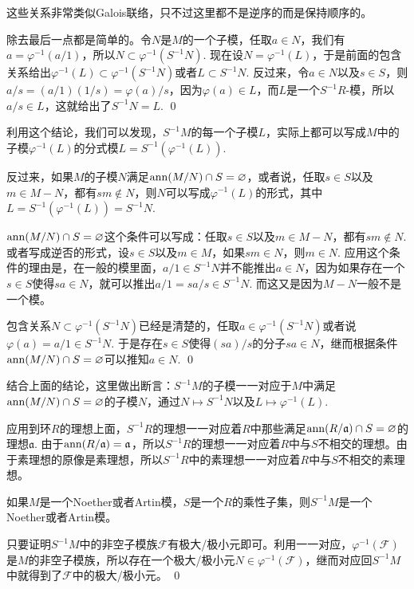 这些关系非常类似Galois联络，只不过这里都不是逆序的而是保持顺序的。

\proof
	除去最后一点都是简单的。令$N$是$M$的一个子模，任取$a\in N$，我们有$a=\varphi^{-1}(a/1)$，所以$N\subset \varphi^{-1}(S^{-1}N)$. 现在设$N=\varphi^{-1}(L)$，于是前面的包含关系给出$\varphi^{-1}(L)\subset \varphi^{-1}(S^{-1}N)$或者$L\subset S^{-1}N$. 反过来，令$a\in N$以及$s\in S$，则$a/s=(a/1)(1/s)=\varphi(a)/s$，因为$\varphi(a)\in L$，而$L$是一个$S^{-1}R$-模，所以$a/s\in L$，这就给出了$S^{-1}N=L$.
\qed

利用这个结论，我们可以发现，$S^{-1}M$的每一个子模$L$，实际上都可以写成$M$中的子模$\varphi^{-1}(L)$的分式模$L=S^{-1}(\varphi^{-1}(L))$. 

\para 反过来，如果$M$的子模$N$满足$\operatorname{ann}(M/N)\cap S=\varnothing$，或者说，任取$s\in S$以及$m\in M-N$，都有$sm\not\in N$，则$N$可以写成$\varphi^{-1}(L)$的形式，其中$L=S^{-1}(\varphi^{-1}(L))=S^{-1}N$. 

$\operatorname{ann}(M/N)\cap S=\varnothing$这个条件可以写成：任取$s\in S$以及$m\in M-N$，都有$sm\not\in N$. 或者写成逆否的形式，设$s\in S$以及$m\in M$，如果$sm\in N$，则$m\in N$. 应用这个条件的理由是，在一般的模里面，$a/1\in S^{-1}N$并不能推出$a\in N$，因为如果存在一个$s\in S$使得$sa\in N$，就可以推出$a/1=sa/s\in S^{-1}N$. 而这又是因为$M-N$一般不是一个模。

\proof
	包含关系$N\subset \varphi^{-1}(S^{-1}N)$已经是清楚的，任取$a\in \varphi^{-1}(S^{-1}N)$或者说$\varphi(a)=a/1\in S^{-1}N$. 于是存在$s\in S$使得$(sa)/s$的分子$sa\in N$，继而根据条件$\operatorname{ann}(M/N)\cap S=\varnothing$可以推知$a\in N$. 
\qed

\pro 结合上面的结论，这里做出断言：$S^{-1}M$的子模一一对应于$M$中满足$\operatorname{ann}(M/N)\cap S=\varnothing$的子模$N$，通过$N\mapsto S^{-1}N$以及$L\mapsto \varphi^{-1}(L)$.

应用到环$R$的理想上面，$S^{-1}R$的理想一一对应着$R$中那些满足$\operatorname{ann}(R/\mathfrak{a})\cap S=\varnothing$的理想$\mathfrak{a}$. 由于$\operatorname{ann}(R/\mathfrak{a})=\mathfrak{a}$，所以$S^{-1}R$的理想一一对应着$R$中与$S$不相交的理想。由于素理想的原像是素理想，所以$S^{-1}R$中的素理想一一对应着$R$中与$S$不相交的素理想。

\pro 如果$M$是一个Noether或者Artin模，$S$是一个$R$的乘性子集，则$S^{-1}M$是一个Noether或者Artin模。

\proof
	只要证明$S^{-1}M$中的非空子模族$\mathcal{F}$有极大/极小元即可。利用一一对应，$\varphi^{-1}(\mathcal{F})$是$M$的非空子模族，所以存在一个极大/极小元$N\in \varphi^{-1}(\mathcal{F})$，继而对应回$S^{-1}M$中就得到了$\mathcal{F}$中的极大/极小元。
\qed

